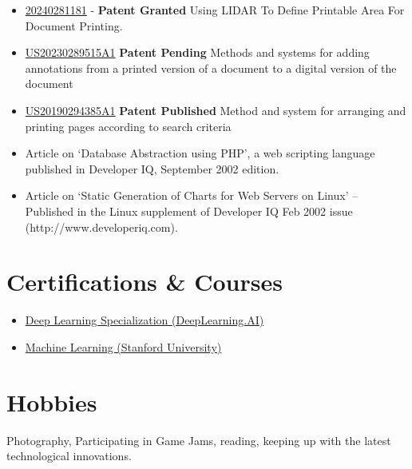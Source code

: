 \documentclass[a4paper,12pt]{article}
\begin{document}
\begin{itemize}
  \setlength\itemsep{-0.5em}

\item
  \href{https://patents.justia.com/patent/20240281181}{20240281181} -
  \textbf{Patent Granted} \textendash Using LIDAR To Define Printable Area For
  Document Printing.
  
\item
  \href{https://patents.google.com/patent/US20230289515A1}{US20230289515A1}
  \textbf{Patent Pending} \textendash Methods and systems for adding annotations
  from a printed version of a document to a digital version of the
  document

\item \href{https://patents.google.com/patent/US20190294385A1}{US20190294385A1} \textbf{Patent Published} \textendash Method and system for arranging and printing pages according to search criteria
  
\item Article on `Database Abstraction using PHP', a web scripting
  language published in Developer IQ, September 2002 edition.

\item Article on `Static Generation of Charts for Web Servers on
  Linux' – Published in the Linux supplement of Developer IQ Feb 2002
  issue (http://www.developeriq.com).

\end{itemize}


\section*{Certifications \& Courses}

\begin{itemize}
  
  \setlength\itemsep{-0.5em}
  
\item
  \href{https://www.coursera.org/account/accomplishments/specialization/Y9XD9ZQ3EGG2}{Deep Learning Specialization (DeepLearning.AI)}
  
\item
  \href{https://www.coursera.org/account/accomplishments/verify/2YVCNYET6XSL}{Machine Learning (Stanford University)}
  
\end{itemize}

\section*{Hobbies}

\href{https://www.flickr.com/photos/shobanjayaraj/}{\faFlickr} Photography, Participating in \href{https://shoban.itch.io/}{\faItchIo} Game Jams, \href{https://www.goodreads.com/user/show/54087481-shoban-jayaraj}{\faGoodreads} reading, keeping up with the latest technological innovations.
\end{document}
